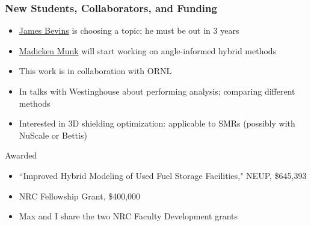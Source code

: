 \documentclass[xcolor=x11names,compress]{beamer}
\renewcommand{\(}{\begin{columns}}
\renewcommand{\)}{\end{columns}}
\newcommand{\<}[1]{\begin{column}{#1}}
\renewcommand{\>}{\end{column}}
\begin{document}
\begin{frame}[fragile]
  \frametitle{New Students, Collaborators, and Funding}

	\begin{itemize}
	  \item \underline{James Bevins} is choosing a topic; he must be out in 3 years
	  \item \underline{Madicken Munk} will start working on angle-informed hybrid methods
	  \item This work is in collaboration with ORNL
	  \item In talks with Westinghouse about performing analysis; comparing different methods
	  \item Interested in 3D shielding optimization: applicable to SMRs (possibly with NuScale or Bettis)
	\end{itemize}

Awarded 
  	\begin{itemize}
  	\item ``Improved Hybrid Modeling of Used Fuel Storage Facilities," NEUP, \$645,393
  	\item NRC Fellowship Grant, \$400,000
  	\item Max and I share the two NRC Faculty Development grants
	\end{itemize}

\end{frame}


\end{document}
